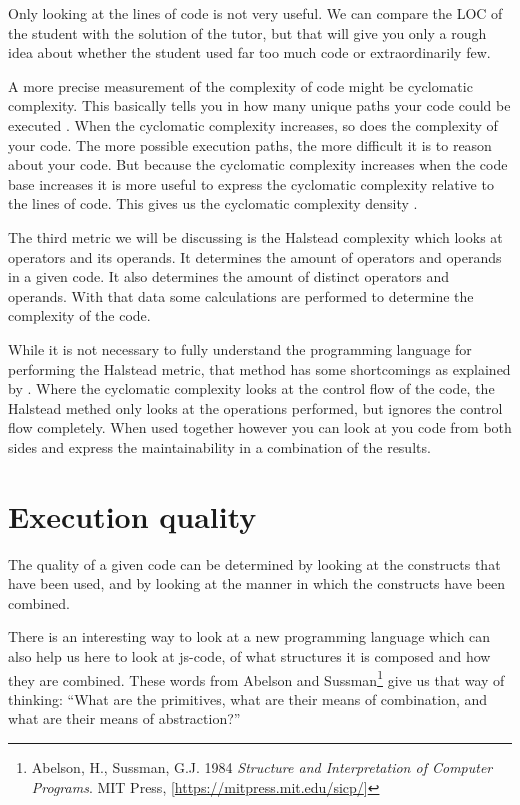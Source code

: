 Only looking at the lines of \gls{code} is not very useful.
We can compare the LOC of the \gls{student}
with the \gls{solution} of the \gls{tutor},
but that will give you only a rough idea about
whether the \gls{student} used far too much \gls{code} or extraordinarily few.

A more precise measurement of the complexity of code
might be cyclomatic complexity.
This basically tells you in how many unique paths
your \gls{code} could be executed \citep{website:js-complexity}.
When the cyclomatic complexity increases,
so does the complexity of your \gls{code}.
The more possible execution paths,
the more difficult it is to reason about your \gls{code}.
But because the cyclomatic complexity increases
when the code base increases
it is more useful to express the cyclomatic complexity relative to
the lines of \gls{code}.
This gives us the cyclomatic complexity density \citep{gill1991cyclomatic}.

The third metric we will be discussing is the Halstead complexity
which looks at operators and its operands.
It determines the amount of operators and operands in a given \gls{code}.
It also determines the amount of distinct operators and operands.
With that data some calculations are performed
to determine the complexity of the \gls{code}.

While it is not necessary to fully understand
the programming language for performing the Halstead metric,
that method has some shortcomings as explained by \citet{yu2010survey}.
Where the cyclomatic complexity looks at the control flow of the code,
the Halstead methed only looks at the operations performed,
but ignores the control flow completely.
When used together however you can look at you \gls{code} from both sides
and express the \gls{maintainability} in a combination of the results.

\section{Execution quality}

The quality of a given \gls{code} can be determined by looking at
the \glspl{construct} that have been used,
and by looking at the manner in which the \glspl{construct} have been combined.

There is an interesting way to look at a new programming language
which can also help us here to look at \gls{js-code},
of what structures it is composed and how they are combined.
These words from Abelson and
Sussman\footnote{Abelson, H., Sussman, G.J. 1984
  {\em Structure and Interpretation of Computer Programs}.
  MIT Press, [\url{https://mitpress.mit.edu/sicp/}]}
give us that way of thinking:
``What are the primitives, what are their means of combination,
and what are their means of abstraction?''

